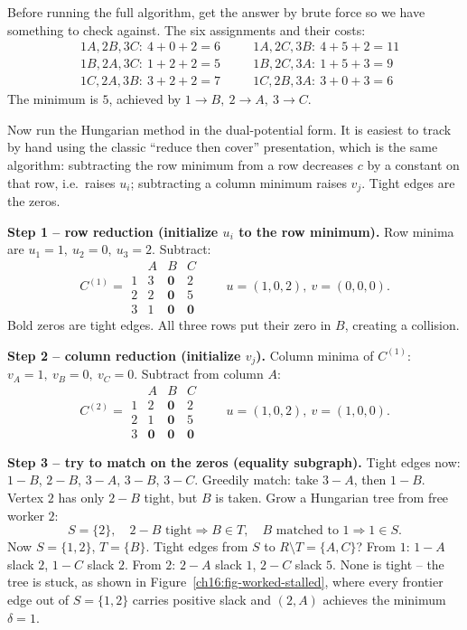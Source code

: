 \begin{labbox}
Before running the full algorithm, get the answer by brute force so we have something to check against. The six assignments and their costs:
\[
\begin{aligned}
&1A,2B,3C:\ 4+0+2=6 &\quad& 1A,2C,3B:\ 4+5+2=11\\
&1B,2A,3C:\ 1+2+2=5 &\quad& 1B,2C,3A:\ 1+5+3=9\\
&1C,2A,3B:\ 3+2+2=7 &\quad& 1C,2B,3A:\ 3+0+3=6
\end{aligned}
\]
The minimum is $5$, achieved by $1\!\to\!B,\ 2\!\to\!A,\ 3\!\to\!C$.
\end{labbox}

Now run the Hungarian method in the dual-potential form. It is easiest to track by hand using the classic ``reduce then cover'' presentation, which is the same algorithm: subtracting the row minimum from a row decreases $c$ by a constant on that row, i.e.\ raises $u_i$; subtracting a column minimum raises $v_j$. Tight edges are the zeros.

\textbf{Step 1 -- row reduction (initialize $u_i$ to the row minimum).}
Row minima are $u_1=1,\ u_2=0,\ u_3=2$. Subtract:
\[
C^{(1)}=\begin{array}{c|ccc}
   & A & B & C\\\hline
 1 & 3 & \mathbf{0} & 2\\
 2 & 2 & \mathbf{0} & 5\\
 3 & 1 & \mathbf{0} & \mathbf{0}
\end{array}
\qquad u=(1,0,2),\ v=(0,0,0).
\]
Bold zeros are tight edges. All three rows put their zero in $B$, creating a collision.

\textbf{Step 2 -- column reduction (initialize $v_j$).}
Column minima of $C^{(1)}$: $v_A=1,\ v_B=0,\ v_C=0$. Subtract from column $A$:
\[
C^{(2)}=\begin{array}{c|ccc}
   & A & B & C\\\hline
 1 & 2 & \mathbf{0} & 2\\
 2 & 1 & \mathbf{0} & 5\\
 3 & \mathbf{0} & \mathbf{0} & \mathbf{0}
\end{array}
\qquad u=(1,0,2),\ v=(1,0,0).
\]

\textbf{Step 3 -- try to match on the zeros (equality subgraph).}
Tight edges now: $1\!-\!B$, $2\!-\!B$, $3\!-\!A$, $3\!-\!B$, $3\!-\!C$. Greedily match: take $3\!-\!A$, then $1\!-\!B$. Vertex $2$ has only $2\!-\!B$ tight, but $B$ is taken. Grow a Hungarian tree from free worker $2$:
\[
S=\{2\},\quad 2\!-\!B \text{ tight} \Rightarrow B\in T,\quad B \text{ matched to } 1 \Rightarrow 1\in S.
\]
Now $S=\{1,2\}$, $T=\{B\}$. Tight edges from $S$ to $R\setminus T=\{A,C\}$? From $1$: $1\!-\!A$ slack $2$, $1\!-\!C$ slack $2$. From $2$: $2\!-\!A$ slack $1$, $2\!-\!C$ slack $5$. None is tight -- the tree is stuck, as shown in Figure~\ref{ch16:fig-worked-stalled}, where every frontier edge out of $S=\{1,2\}$ carries positive slack and $(2,A)$ achieves the minimum $\delta=1$.

